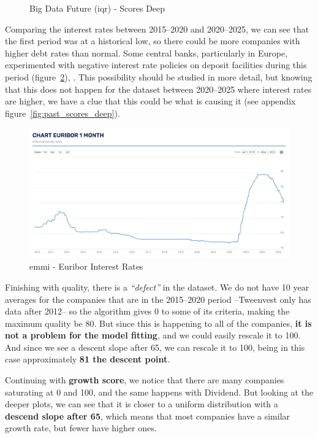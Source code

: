 \documentclass[11pt,english,a4paper,hidelinks]{book}
\begin{document}
\begin{figure}[H]
\begin{minipage}{0.5\textwidth}
        \caption{Big Data Future (\acrshort{iqr}) - Scores Deep}
        \label{fig:scores_deep}
    \end{minipage}
\end{figure}

\noindent Comparing the interest rates between 2015--2020 and 2020--2025, we can see that the first period was at a historical low, so there could be more companies with higher debt rates than normal. Some central banks, particularly in Europe, experimented with negative interest rate policies on deposit facilities during this period (figure~\ref{fig:euribor}), \cite{euribor_emmi}. This possibility should be studied in more detail, but knowing that this does not happen for the dataset between 2020--2025 where interest rates are higher, we have a clue that this could be what is causing it (see appendix figure~\ref{fig:past_scores_deep}).

\begin{figure}[H]
    \centering
    \includegraphics[width=1\linewidth]{images/macros/Euribor.png}
    \caption{\acrshort{emmi} - Euribor Interest Rates}
    \label{fig:euribor}
\end{figure}


\vspace{0.5cm}
\noindent Finishing with quality, there is a \textit{``defect''} in the dataset. We do not have 10 year averages for the companies that are in the 2015--2020 period --Tweenvest only has data after 2012-- so the algorithm gives 0 to some of its criteria, making the maximum quality be 80. But since this is happening to all of the companies, \textbf{it is not a problem for the model fitting}, and we could easily rescale it to 100. And since we see a descent slope after 65, we can rescale it to 100, being in this case approximately \textbf{81 the descent point}.

\vspace{0.5cm}
\noindent Continuing with \textbf{growth score}, we notice that there are many companies saturating at 0 and 100, and the same happens with Dividend. But looking at the deeper plots, we can see that it is closer to a uniform distribution with a \textbf{descend slope after 65}, which means that most companies have a similar growth rate, but fewer have higher ones.
\end{document}
